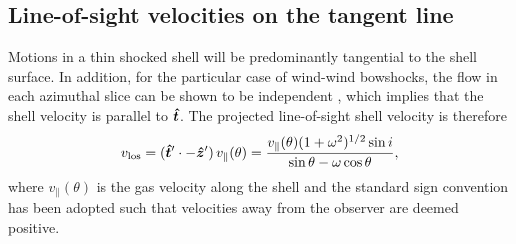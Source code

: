   \subsection{Line-of-sight velocities on the tangent line}
  \label{sec:line-sight-veloc}
  Motions in a thin shocked shell will be predominantly tangential to the shell surface. In addition, for the particular case of wind-wind bowshocks, the flow in each azimuthal slice can be shown to be independent \citep{Wilkin:2000a}, which implies that the shell velocity is parallel to \(\bm{\hat{t}}\). The projected line-of-sight shell velocity is therefore
  \begin{equation}
    \label{eq:vlos}
    v_{\mathrm{los}} = (\bm{\hat{t}}' \cdot -\bm{\hat{z}}') \, v_{\parallel}(\theta) = \frac{v_{\parallel}(\theta) (1+\omega^2)^{1/2} \sin i }{\sin\theta - \omega\cos\theta} ,
  \end{equation}
  where \( v_{\parallel}(\theta)\) is the gas velocity along the shell and the standard sign convention has been adopted such that velocities away from the observer are deemed positive. 



